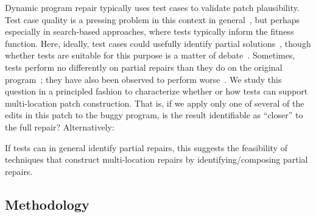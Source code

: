 \documentclass[10pt, conference]{IEEEtran}
\begin{document}
Dynamic program repair typically uses test cases to validate patch plausibility. 
%
Test case quality is a pressing problem in this context in
general~\cite{Smith15fse}, but perhaps especially in search-based approaches,
where tests typically inform the fitness
function. Here, ideally, test cases could usefully identify partial
solutions~\cite{better-fitness}, 
though whether tests are suitable for this purpose is a matter of
debate~\cite{ae,rsrepair}.  Sometimes, tests perform no differently on partial
repairs than they do on the original program~\cite{chris-thesis,
  source-code-checkpoint}; they have also been observed to perform
worse~\cite{gecco09}.  
%
We study this question in a principled fashion to characterize whether or how
tests can support multi-location patch construction.  That is, if we apply only one of
several of the edits in this patch to the buggy program, is the result
identifiable as ``closer'' to the full repair? Alternatively:


If tests can in general identify partial repairs, this suggests the feasibility
of techniques that construct multi-location repairs by identifying/composing
partial repairs.



\subsection{Methodology}
\label{sec:partial-repair-methodology}
\end{document}
